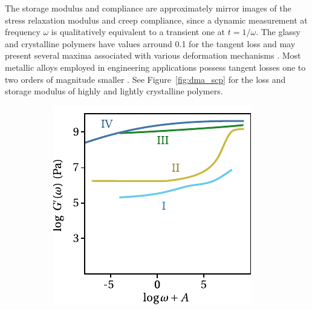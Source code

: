 The storage modulus and compliance are approximately mirror images of the stress relaxation modulus and creep compliance, since a dynamic measurement at frequency $\omega$ is qualitatively equivalent to a transient one at $t=1/\omega$.
The glassy and crystalline polymers have values arround 0.1 for the tangent loss and may present several maxima associated with various deformation mechanisms \citep{ferryViscoelasticPropertiesPolymers1980}.
Most metallic alloys employed in engineering applications possess tangent losses one to two orders of magnitude smaller \citep{ashbyMaterialsSelectionMechanical1999}.
See Figure~\ref{fig:dma_scp} for the loss and storage modulus of highly and lightly crystalline polymers.
\begin{figure}[hbtp]
\centering
\begin{subfigure}[b]{0.45\textwidth}
\centering
\includegraphics[width=\textwidth]{figures/storage_modulus_scp}
\caption{}
\label{subfig:storage_modulus_scp}
\end{subfigure} \hfill
    \begin{subfigure}[b]{0.45\textwidth}
        \centering

\end{subfigure}
\end{figure}
